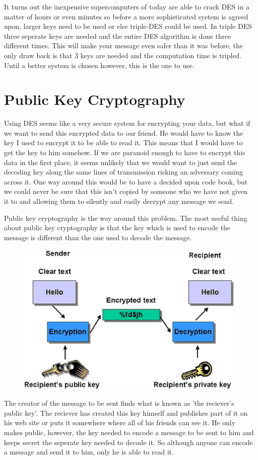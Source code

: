 \documentclass[12pt]{report}
\begin{document}
It turns out the inexpensive supercomputers of today are able to crack DES in a matter of hours or even minutes so before a more sophisticated system is agreed upon, larger keys need to be used or else triple-DES could be used.  In triple DES three seperate keys are needed and the entire DES algorithm is done three different times.  This will make your message even safer than it was before, the only draw back is that 3 keys are needed and the computation time is tripled.  Until a better system is chosen however, this is the one to use.

\section*{Public Key Cryptography}
Using DES seems like a very secure system for encrypting your data, but what if we want to send this encrypted data to our friend.  He would have to know the key I used to encrypt it to be able to read it.  This means that I would have to get the key to him somehow.  If we are paranoid enough to have to encrypt this data in the first place, it seems unlikely that we would want to just send the decoding key along the same lines of transmission risking an adversary coming across it.  One way around this would be to have a decided upon code book, but we could never be sure that this isn't copied by someone who we have not given it to and allowing them to silently and easily decrypt any message we send.

Public key cryptography is the way around this problem.  The most useful thing about public key cryptography is that the key which is used to encode the message is different than the one used to decode the message.
\begin{figure}[h]
\centering
\caption{}
\cite{public}
\includegraphics{publickey.eps}
\end{figure}
The creator of the message to be sent finds what is known as 'the reciever's public key'.  The reciever has created this key himself and publishes part of it on his web site or puts it somewhere where all of his friends can see it.  He only makes public, however, the key needed to encode a message to be sent to him and keeps secret the seperate key needed to decode it.  So although anyone can encode a message and send it to him, only he is able to read it.
\end{document}
